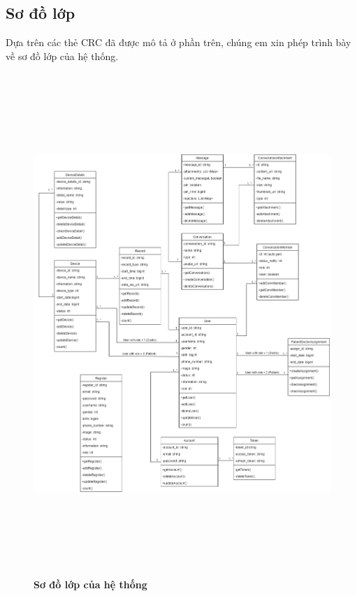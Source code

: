 \subsection{Sơ đồ lớp}
  Dựa trên các thẻ CRC đã được mô tả ở phần trên, chúng em xin phép trình bày về sơ đồ lớp của hệ thống.
  \begin{figure}[H]
    \centering
    \includegraphics*[width = 16cm, height = 19cm]{Images/UML/UML.drawio.png}
    \caption[Sơ đồ lớp của hệ thống]{\bfseries \fontsize{12pt}{0pt}
    \selectfont Sơ đồ lớp của hệ thống}
    \label{UML}
  \end{figure}

